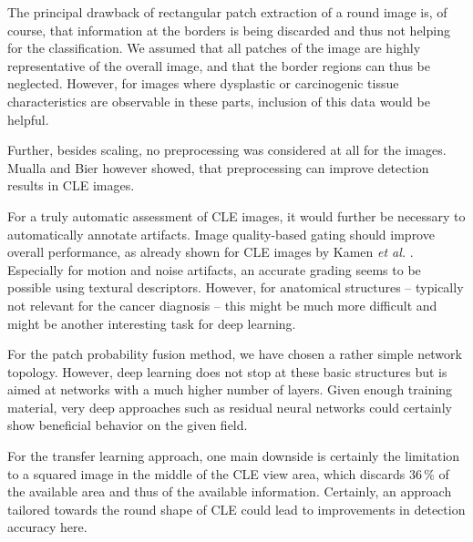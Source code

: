 \documentclass[fleqn,10pt]{wlscirep}
\begin{document}

The principal drawback of rectangular patch extraction of a round
image is, of course, that information at the borders is being
discarded and thus not helping for the classification. We assumed
that all patches of the image are highly representative of the overall
image, and that the border regions can thus be neglected. However, for
images where dysplastic or carcinogenic tissue characteristics are
observable in these parts, inclusion of this data would be helpful.

Further, besides scaling, no preprocessing was considered at all for the images. Mualla\cite{Mualla:2014ko} and Bier\cite{Bier:2015ju} however showed, that preprocessing can improve detection results in CLE images.

For a truly automatic assessment of CLE images, it would further be necessary to automatically annotate artifacts. Image quality-based gating should improve overall performance, as already shown for CLE images by Kamen \textit{et al.} \cite{Kamen:2016jw}. Especially for motion and noise artifacts, an accurate grading seems to be possible using textural descriptors. However, for anatomical structures -- typically not relevant for the cancer diagnosis -- this might be much more difficult and might be another interesting task for deep learning.


For the patch probability fusion method, we have chosen a rather simple network topology. However, deep learning does not stop at these basic structures but is aimed at networks with a much higher number of layers. Given enough training material, very deep approaches such as residual neural networks \cite{He:2016ib} could certainly show beneficial behavior on the given field.

For the transfer learning approach, one main downside is certainly the limitation to a squared image in the middle of the CLE view area, which discards 36\,\% of the available area and thus of the available information. Certainly, an approach tailored towards the round shape of CLE could lead to improvements in detection accuracy here.
\end{document}
